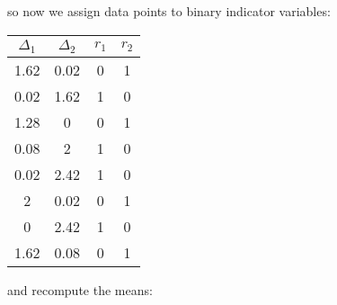 so now we assign data points to binary indicator variables:
\begin{center}
 \begin{tabular}{||c c c c||} 
 \hline
 $\Delta_1$ & $\Delta_2$ & $r_1$ & $r_2$  \\ [0.5ex] 
 \hline\hline
 1.62 & 0.02 & 0 & 1 \\ 
 \hline
 0.02 & 1.62  & 1 & 0 \\ 
 \hline
1.28 & 0 & 0 & 1 \\
 \hline
0.08 & 2 & 1 & 0 \\
 \hline
 0.02 & 2.42 & 1 & 0 \\ 
  \hline
2 & 0.02 & 0 & 1 \\
 \hline
0 & 2.42 & 1 & 0 \\
 \hline
 1.62 & 0.08 & 0 & 1 \\ [1ex] 
 \hline
\end{tabular}
\end{center}
and recompute the means:
$$

$$



